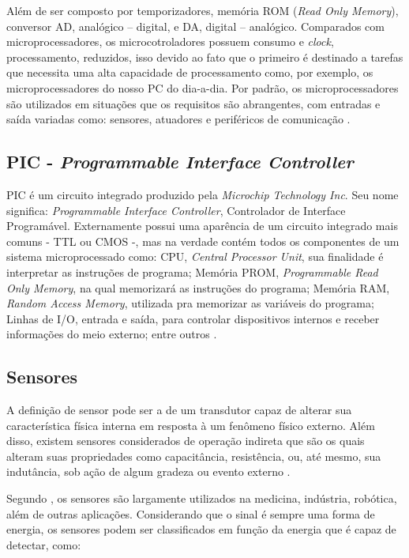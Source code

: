 Além de ser composto por temporizadores, memória ROM (\emph{Read Only Memory}), conversor AD, analógico – digital, e DA, digital – analógico.
Comparados com microprocessadores, os microcotroladores possuem consumo e \emph{clock}, processamento, reduzidos, isso devido ao fato que o primeiro é destinado a tarefas que necessita uma alta capacidade de processamento como, por exemplo, os microprocessadores do nosso PC do dia-a-dia. Por padrão, os microprocessadores são utilizados em situações que os requisitos são abrangentes, com entradas e saída variadas como: sensores, atuadores e periféricos de comunicação \cite{lee2011introduction}.

\subsection{PIC - \emph{Programmable Interface Controller}}
\label{sec:pic}
PIC é um circuito integrado produzido pela \emph{Microchip Technology Inc}. Seu nome significa: \emph{Programmable Interface Controller}, Controlador de Interface Programável. Externamente possui uma aparência de um circuito integrado mais comuns - TTL ou CMOS -, mas na verdade contém todos os componentes de um sistema microprocessado como: CPU, \emph{Central Processor Unit}, sua finalidade é interpretar as instruções de programa; Memória PROM, \emph{Programmable Read Only Memory}, na qual memorizará as instruções do programa; Memória RAM, \emph{Random Access Memory}, utilizada pra memorizar as variáveis do programa; Linhas de I/O, entrada e saída, para controlar dispositivos internos e receber informações do meio externo; entre outros \cite{radio2012amadores,wikipedia2012pic}.

\subsection{Sensores}
A definição de sensor pode ser a de um transdutor capaz de alterar sua característica física interna em resposta à um fenômeno físico externo. Além disso, existem sensores considerados de operação indireta que são os quais alteram suas propriedades como capacitância, resistência, ou, até mesmo, sua indutância, sob ação de algum gradeza ou evento externo \cite{rosario2006principios}. 

Segundo \cite{nomadusp2014}, os sensores são largamente utilizados na medicina, indústria, robótica, além de outras aplicações. Considerando que o sinal é sempre uma forma de energia, os sensores podem ser classificados em função da energia que é capaz de detectar, como:

